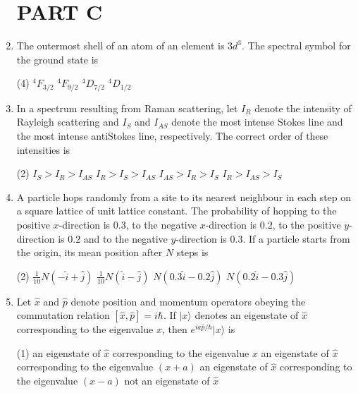 \begin{enumerate}
\section{PART C}
\item The outermost shell of an atom of an element is $3 d^{3}$. The spectral symbol for the ground state is
 \begin{tasks}(4)
	\task[\textbf{a.}] ${ }^{4} F_{3 / 2}$
	\task[\textbf{b.}]${ }^{4} F_{9 / 2}$
	\task[\textbf{c.}]${ }^{4} D_{7 / 2}$
	\task[\textbf{d.}] ${ }^{4} D_{1 / 2}$
\end{tasks}
\item In a spectrum resulting from Raman scattering, let $I_{R}$ denote the intensity of Rayleigh scattering and $I_{S}$ and $I_{A S}$ denote the most intense Stokes line and the most intense antiStokes line, respectively. The correct order of these intensities is
 \begin{tasks}(2)
	\task[\textbf{a.}] $I_{S}>I_{R}>I_{A S}$
	\task[\textbf{b.}]$I_{R}>I_{S}>I_{A S}$
	\task[\textbf{c.}]$I_{A S}>I_{R}>I_{S}$
	\task[\textbf{d.}]$I_{R}>I_{A S}>I_{S}$ 
\end{tasks}
\item A particle hops randomly from a site to its nearest neighbour in each step on a square lattice of unit lattice constant. The probability of hopping to the positive $x$-direction is $0.3$, to the negative $x$-direction is $0.2$, to the positive $y$-direction is $0.2$ and to the negative $y$-direction is $0.3$. If a particle starts from the origin, its mean position after $N$ steps is
 \begin{tasks}(2)
	\task[\textbf{a.}] $\frac{1}{10} N(-\hat{i}+\hat{j})$
	\task[\textbf{b.}]$\frac{1}{10} N(\hat{i}-\hat{j})$
	\task[\textbf{c.}]$N(0.3 \hat{i}-0.2 \hat{j})$
	\task[\textbf{d.}]  $N(0.2 \hat{i}-0.3 \hat{j})$
\end{tasks}
\item Let $\hat{x}$ and $\hat{p}$ denote position and momentum operators obeying the commutation relation $[\hat{x}, \hat{p}]=i \hbar$. If $|x\rangle$ denotes an eigenstate of $\hat{x}$ corresponding to the eigenvalue $x$, then $e^{i a \hat{p} / \hbar}|x\rangle$ is	
 \begin{tasks}(1)
	\task[\textbf{a.}] an eigenstate of $\hat{x}$ corresponding to the eigenvalue $x$
	\task[\textbf{b.}] an eigenstate of $\hat{x}$ corresponding to the eigenvalue $(x+a)$
	\task[\textbf{c.}]an eigenstate of $\hat{x}$ corresponding to the eigenvalue $(x-a)$
	\task[\textbf{d.}] not an eigenstate of $\hat{x}$	
\end{tasks}

\end{enumerate}
